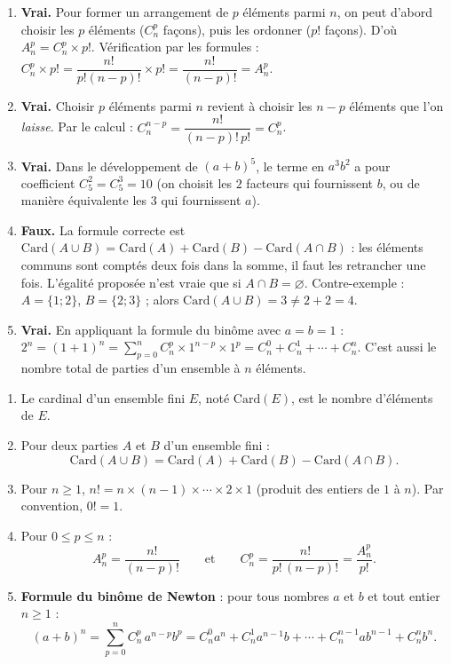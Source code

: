 \documentclass[11pt]{article}
\newcommand{\cle}[1]{{\popxbold\color{popdark}#1}}
\begin{document}
\begin{corrige}
\begin{enumerate}
\item \textbf{Vrai.} Pour former un arrangement de $p$ éléments parmi $n$, on peut d'abord choisir les $p$ éléments ($C_n^p$ façons), puis les ordonner ($p!$ façons). D'où $A_n^p = C_n^p \times p!$. Vérification par les formules : $C_n^p \times p! = \dfrac{n!}{p!(n-p)!} \times p! = \dfrac{n!}{(n-p)!} = A_n^p$.
\item \textbf{Vrai.} Choisir $p$ éléments parmi $n$ revient à choisir les $n-p$ éléments que l'on \emph{laisse}. Par le calcul : $C_n^{n-p} = \dfrac{n!}{(n-p)!\,p!} = C_n^p$.
\item \textbf{Vrai.} Dans le développement de $(a+b)^5$, le terme en $a^3 b^2$ a pour coefficient $C_5^2 = C_5^3 = 10$ (on choisit les $2$ facteurs qui fournissent $b$, ou de manière équivalente les $3$ qui fournissent $a$).
\item \textbf{Faux.} La formule correcte est $\mathrm{Card}(A \cup B) = \mathrm{Card}(A) + \mathrm{Card}(B) - \mathrm{Card}(A \cap B)$ : les éléments communs sont comptés deux fois dans la somme, il faut les retrancher une fois. L'égalité proposée n'est vraie que si $A \cap B = \varnothing$. Contre-exemple : $A = \{1;2\}$, $B = \{2;3\}$ ; alors $\mathrm{Card}(A \cup B) = 3 \neq 2 + 2 = 4$.
\item \textbf{Vrai.} En appliquant la formule du binôme avec $a = b = 1$ : $2^n = (1+1)^n = \sum_{p=0}^{n} C_n^p \times 1^{n-p} \times 1^p = C_n^0 + C_n^1 + \cdots + C_n^n$. C'est aussi le nombre total de parties d'un ensemble à $n$ éléments.
\end{enumerate}
\end{corrige}

\begin{corrige}
\begin{enumerate}
\item Le \cle{cardinal} d'un ensemble fini $E$, noté $\mathrm{Card}(E)$, est le nombre d'éléments de $E$.
\item Pour deux parties $A$ et $B$ d'un ensemble fini :
\[ \mathrm{Card}(A \cup B) = \mathrm{Card}(A) + \mathrm{Card}(B) - \mathrm{Card}(A \cap B). \]
\item Pour $n \ge 1$, $n! = n \times (n-1) \times \cdots \times 2 \times 1$ (produit des entiers de $1$ à $n$). Par convention, $0! = 1$.
\item Pour $0 \le p \le n$ :
\[ A_n^p = \frac{n!}{(n-p)!} \qquad \text{et} \qquad C_n^p = \frac{n!}{p!\,(n-p)!} = \frac{A_n^p}{p!}. \]
\item \textbf{Formule du binôme de Newton} : pour tous nombres $a$ et $b$ et tout entier $n \ge 1$ :
\[ (a+b)^n = \sum_{p=0}^{n} C_n^p \, a^{n-p} b^p = C_n^0 a^n + C_n^1 a^{n-1} b + \cdots + C_n^{n-1} a b^{n-1} + C_n^n b^n. \]
\end{enumerate}
\end{corrige}
\end{document}
